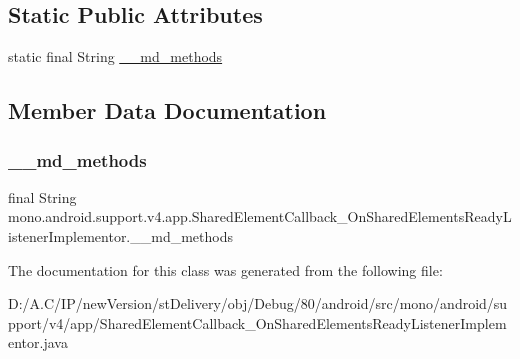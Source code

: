 \subsection*{Static Public Attributes}
\begin{DoxyCompactItemize}
\item 
static final String \hyperlink{classmono_1_1android_1_1support_1_1v4_1_1app_1_1_shared_element_callback___on_shared_elements_ready_listener_implementor_a23f34ccac6fe95f25d35d1a3d4f1c957}{\+\_\+\+\_\+md\+\_\+methods}
\end{DoxyCompactItemize}


\subsection{Member Data Documentation}
\mbox{\label{classmono_1_1android_1_1support_1_1v4_1_1app_1_1_shared_element_callback___on_shared_elements_ready_listener_implementor_a23f34ccac6fe95f25d35d1a3d4f1c957}} 
\subsubsection{\texorpdfstring{\+\_\+\+\_\+md\+\_\+methods}{\_\_md\_methods}}
{\footnotesize\ttfamily final String mono.\+android.\+support.\+v4.\+app.\+Shared\+Element\+Callback\+\_\+\+On\+Shared\+Elements\+Ready\+Listener\+Implementor.\+\_\+\+\_\+md\+\_\+methods\hspace{0.3cm}{\ttfamily [static]}}



The documentation for this class was generated from the following file\+:\begin{DoxyCompactItemize}
\item 
D\+:/\+A.\+C/\+I\+P/new\+Version/st\+Delivery/obj/\+Debug/80/android/src/mono/android/support/v4/app/Shared\+Element\+Callback\+\_\+\+On\+Shared\+Elements\+Ready\+Listener\+Implementor.\+java\end{DoxyCompactItemize}
